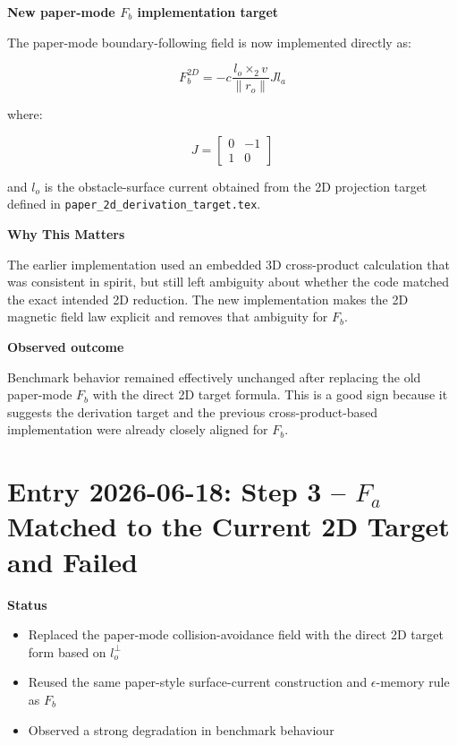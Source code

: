 \documentclass[11pt]{article}
\begin{document}
\textbf{New paper-mode \(F_b\) implementation target}

The paper-mode boundary-following field is now implemented directly as:

\begin{equation}
F_b^{2D}
=
-c
\frac{l_o \times_2 v}{\lVert r_o \rVert}
J l_a
\end{equation}

where:

\begin{equation}
J =
\begin{bmatrix}
0 & -1 \\
1 & 0
\end{bmatrix}
\end{equation}

and \(l_o\) is the obstacle-surface current obtained from the 2D projection
target defined in \texttt{paper\_2d\_derivation\_target.tex}.

\textbf{Why This Matters}

The earlier implementation used an embedded 3D cross-product calculation that
was consistent in spirit, but still left ambiguity about whether the code
matched the exact intended 2D reduction. The new implementation makes the 2D
magnetic field law explicit and removes that ambiguity for \(F_b\).

\textbf{Observed outcome}

Benchmark behavior remained effectively unchanged after replacing the old
paper-mode \(F_b\) with the direct 2D target formula. This is a good sign
because it suggests the derivation target and the previous cross-product-based
implementation were already closely aligned for \(F_b\).

\section*{Entry 2026-06-18: Step 3 -- \(F_a\) Matched to the Current 2D Target and Failed}

\textbf{Status}

\begin{itemize}[leftmargin=*]
  \item Replaced the paper-mode collision-avoidance field with the direct 2D target form based on \(l_o^\perp\)
  \item Reused the same paper-style surface-current construction and \(\epsilon\)-memory rule as \(F_b\)
  \item Observed a strong degradation in benchmark behaviour
\end{itemize}
\end{document}
